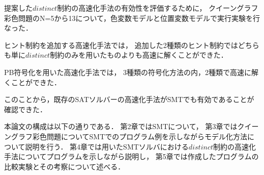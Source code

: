 提案した$distinct$制約の高速化手法の有効性を評価するために，
クイーングラフ彩色問題のN=5から13について，色変数モデルと位置変数モデルで実行実験を行なった．

ヒント制約を追加する高速化手法では，
追加した2種類のヒント制約ではどちらも単に$distinct$制約のみを用いたものよりも高速に解くことができた．

PB符号化を用いた高速化手法では，
3種類の符号化方法の内，2種類で高速に解くことができた．


このことから，既存のSATソルバーの高速化手法がSMTでも有効であることが確認できた．


本論文の構成は以下の通りである．
第2章ではSMTについて，
第3章ではクイーングラフ彩色問題についてSMTでのプログラム例を示しながらモデル化方法について説明を行う．
第4章では用いたSMTソルバにおける$distinct$制約の高速化手法についてプログラムを示しながら説明し，
第5章では作成したプログラムの比較実験とその考察について述べる．

